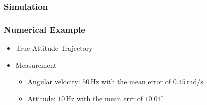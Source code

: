 
\subsubsection[Simulation]{Simulation}
\begin{frame}
\frametitle{Numerical Example}

\begin{itemize}
\item True Attitude Trajectory
    \begin{center}
\end{center}
\pause
\item Measurement
	\begin{itemize}
	\item Angular velocity: $50\,\mathrm{Hz}$ with the mean error of $0.45\,\mathrm{rad/s}$
	\item Attitude: $10\,\mathrm{Hz}$ with the mean errr of $10.04^\circ$
	\end{itemize}
\end{itemize}


\end{frame}


